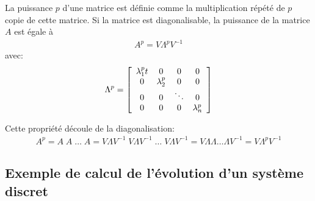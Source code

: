 La puissance $p$ d'une matrice est définie comme la multiplication répété de $p$ copie de cette matrice. Si la matrice est diagonalisable, la puissance de la matrice $A$ est égale à
\begin{align}
A^p = V \Lambda^p V^{-1}
\label{eq:matrixpower}
\end{align}
avec:
\begin{align}
\Lambda^p = 
\left[ \begin{array}{c c c c}  
\lambda_1^p t &  0          & 0 & 0 \\
0         &  \lambda_2^p  & 0      & 0 \\
0         &  0          &\ddots  & 0 \\
0         &  0          & 0  & \lambda_n^p
\end{array} \right]
\end{align}

Cette propriété découle de la diagonalisation:
\begin{align}
A^p = A \; A \; \hdots \; A = V \Lambda V^{-1} \; V \Lambda V^{-1} \;  \hdots \; V \Lambda V^{-1} = V \Lambda \Lambda   \hdots \Lambda V^{-1} = V \Lambda^p V^{-1}
\end{align}

\subsection{Exemple de calcul de l'évolution d'un système discret}

